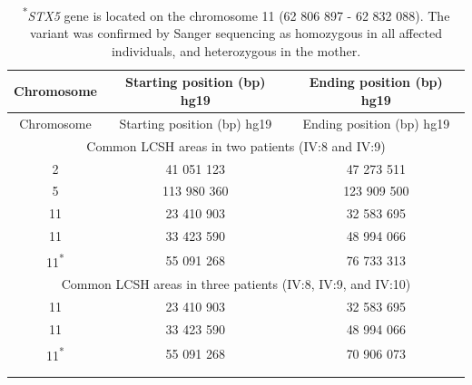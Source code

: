 \footnotesize
\begin{longtable}[c]{c c c}
    \caption{\textbf{Chromosomal microarray analysis}} \\
    Chromosome & Starting position (bp) hg19 & Ending position (bp) hg19 \\
    \hline
    \endfirsthead
    Chromosome & Starting position (bp) hg19 & Ending position (bp) hg19 \\
    \hline  
    \endhead
    \multicolumn{3}{c}{Common LCSH areas in two patients (IV:8 and IV:9)} \\
    2 & 41 051 123 & 47 273 511 \\
    5 & 113 980 360 & 123 909 500 \\
    11 & 23 410 903 & 32 583 695 \\
    11 & 33 423 590 & 48 994 066 \\
    11\textsuperscript{*} & 55 091 268 & 76 733 313 \\
    \hline
    \multicolumn{3}{c}{Common LCSH areas in three patients (IV:8, IV:9, and IV:10)} \\
    11 & 23 410 903 & 32 583 695 \\
    11 & 33 423 590 & 48 994 066 \\
    11\textsuperscript{*} & 55 091 268 & 70 906 073 \\
    \caption*{\textsuperscript{*}\emph{STX5} gene is located on the chromosome 11 (62 806 897 - 62 832 088). The variant was confirmed by Sanger sequencing as homozygous in all affected individuals, and heterozygous in the mother.} \\  
    \label{tbl:ch6tbl5}
\end{longtable}

\clearpage

